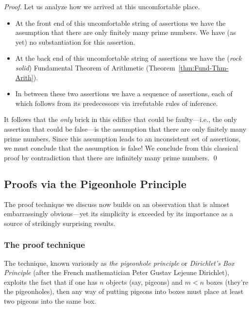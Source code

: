 \begin{proof}
\medskip

Let us analyze how we arrived at this uncomfortable place.
\begin{itemize}
\item
At the front end of this uncomfortable string of assertions we have the assumption that there are only finitely many prime numbers.  We have (as yet) no substantiation for this assertion.
\item
At the back end of this uncomfortable string of assertions we have the ({\em rock solid}) Fundamental Theorem of Arithmetic (Theorem~\ref{thm:Fund-Thm-Arith}).
\item
In between these two assertions we have a sequence of assertions, each of which follows from its predecessors via irrefutable rules of inference.
\end{itemize}
It follows that the {\em only} brick in this edifice that could be faulty---i.e., the only assertion that could be false---is the assumption that there are only finitely many prime numbers.  Since this assumption leads to an inconsistent set of assertions, we must conclude that the assumption is false!  We conclude from this classical proof by contradiction that there are infinitely many prime
numbers.  \qed
\end{proof}


\subsection{Proofs via the Pigeonhole Principle}
\label{sec:pigeonhole}

The proof technique we discuss now builds on an observation that is almost embarrassingly obvious---yet its simplicity is exceeded by its importance as a source of strikingly surprising results.

\subsubsection{The proof technique}

 

The technique, known variously as {\it the pigeonhole principle} or {\it Dirichlet's Box Principle}
(after the French mathematician Peter Gustav Lejeune Dirichlet), exploits the fact that if one has $n$ objects (say, pigeons) and $m < n$ boxes (they're the pigeonholes), then any way of putting pigeons into boxes must place at least two pigeons into the same box.


